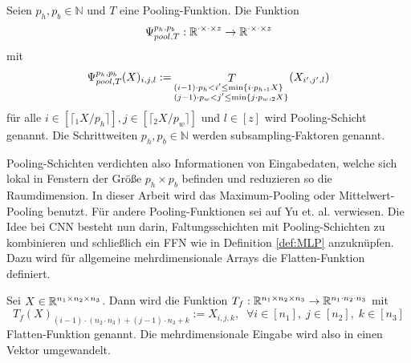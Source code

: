 \begin{defi}
    Seien $p_h, p_b \in \mathbb{N}$ und $T$ eine Pooling-Funktion. Die Funktion 
    \begin{equation*}
        \Psi_{pool,T}^{p_h,p_b}: \mathbb{R}^{\cdot \times \cdot \times z} \rightarrow \mathbb{R}^{\cdot \times \cdot\times z}
    \end{equation*}
    mit
    \begin{equation*}
        \Psi_{pool,T}^{p_h,p_b}(X)_{i,j,l}:= \mathop{T}_{\begin{subarray}{l}(i-1) \cdot p_h < i' \leq \min\{i \cdot p_h, {}_1 X\} \\ 
        (j-1) \cdot p_w < j' \leq \min\{j \cdot p_w, {}_2 X\}\end{subarray}} (X_{i',j',l})  
    \end{equation*}
    für alle  $i \in [\lceil {}_1 X/p_h \rceil], j \in [\lceil {}_2 X/p_w \rceil]$ und $l \in [z]$ wird Pooling-Schicht genannt. Die Schrittweiten $p_h, p_b \in \mathbb{N}$ werden subsampling-Faktoren genannt.
\end{defi}

Pooling-Schichten verdichten also Informationen von Eingabedaten, welche sich lokal in Fenstern der Größe $p_h \times p_b$ befinden und reduzieren so die Raumdimension. In dieser Arbeit wird das Maximum-Pooling oder Mittelwert-Pooling benutzt. Für andere Pooling-Funktionen sei auf Yu et. al.  \cite{yu2014mixed} verwiesen.
Die Idee bei CNN besteht nun darin, Faltungsschichten mit Pooling-Schichten zu kombinieren und schließlich ein FFN wie in Definition \ref{def:MLP} anzuknüpfen.
Dazu wird für allgemeine mehrdimensionale Arrays die Flatten-Funktion definiert.

\begin{defi}
    \label{def:flatten}
    Sei $X \in \mathbb{R}^{n_1 \times n_2 \times n_3}$. Dann wird die Funktion $T_f:\mathbb{R}^{n_1 \times n_2 \times n_3} \rightarrow \mathbb{R}^{n_1 \cdot n_2 \cdot n_3}$ mit 
    \begin{equation*}
        T_f(X)_{(i-1) \cdot (n_2 \cdot n_3)+(j-1) \cdot n_3+k}:= X_{i,j,k}, \; \; \forall i \in [n_1],\; j \in [n_2],\; k \in [n_3]
    \end{equation*}
    Flatten-Funktion genannt. Die mehrdimensionale Eingabe wird also in einen Vektor umgewandelt.
\end{defi}

